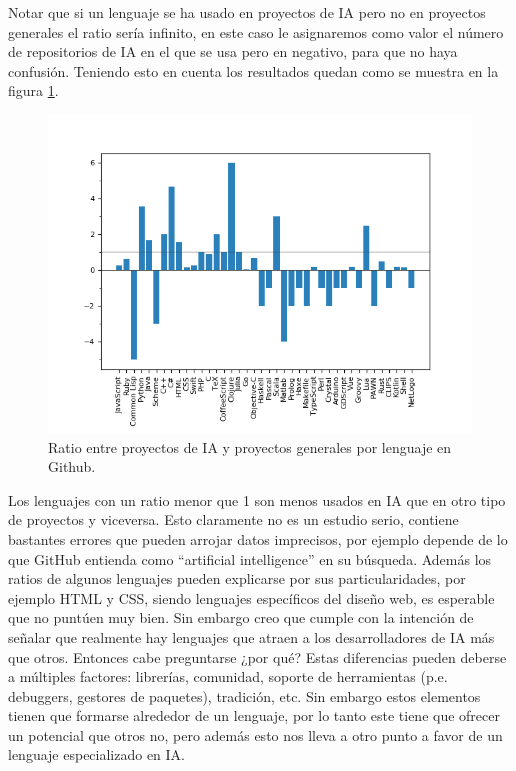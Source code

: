 Notar que si un lenguaje se ha usado en proyectos de IA pero no en proyectos generales el ratio sería infinito, en este caso le asignaremos como valor el número de repositorios de IA en el que se usa pero en negativo, para que no haya confusión. Teniendo esto en cuenta los resultados quedan como se muestra en la figura \ref{fig:proplang}.\\

\begin{figure}[h]
  \begin{center}
    \includegraphics[width=1.0\textwidth]{imagenes/proportion-lang.png}
    \caption{Ratio entre proyectos de IA y proyectos generales por lenguaje en Github.}
    \label{fig:proplang}
  \end{center}
\end{figure}

Los lenguajes con un ratio menor que 1 son menos usados en IA que en otro tipo de proyectos y viceversa. Esto claramente no es un estudio serio, contiene bastantes errores que pueden arrojar datos imprecisos, por ejemplo depende de lo que GitHub entienda como ``artificial intelligence'' en su búsqueda. Además los ratios de algunos lenguajes pueden explicarse por sus particularidades, por ejemplo HTML y CSS, siendo lenguajes específicos del diseño web, es esperable que no puntúen muy bien. Sin embargo creo que cumple con la intención de señalar que realmente hay lenguajes que atraen a los desarrolladores de IA más que otros. Entonces cabe preguntarse ¿por qué? Estas diferencias pueden deberse a múltiples factores: librerías, comunidad, soporte de herramientas (p.e. debuggers, gestores de paquetes), tradición, etc. Sin embargo estos elementos tienen que formarse alrededor de un lenguaje, por lo tanto este tiene que ofrecer un potencial que otros no, pero además esto nos lleva a otro punto a favor de un lenguaje especializado en IA.\\

